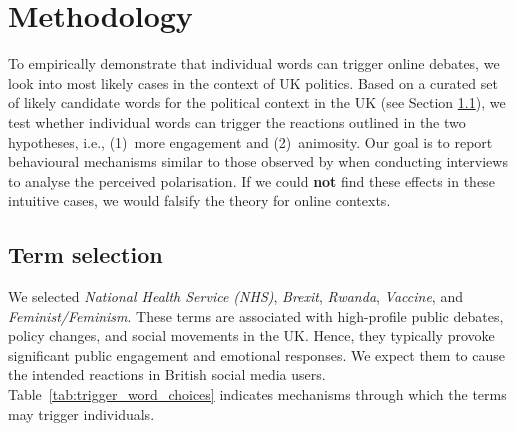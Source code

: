 \section{Methodology}
To empirically demonstrate that individual words can trigger online debates, we look into most likely cases in the context of UK politics. Based on a curated set of likely candidate words for the political context in the UK (see Section \ref{subsec:term_selection}), we test whether individual words can trigger the reactions outlined in the two hypotheses, i.e., (1)\ more engagement and (2)\ animosity. Our goal is to report behavioural mechanisms similar to those observed by \citet{mau2023triggerpunkte} when conducting interviews to analyse the perceived polarisation. If we could \textbf{not} find these effects in these intuitive cases, we would falsify the theory for online contexts.


\subsection{Term selection}\label{subsec:term_selection}
We selected \textit{National Health Service (NHS)}, \textit{Brexit}, \textit{Rwanda}, \textit{Vaccine}, and \textit{Feminist/Feminism}. These terms are associated with high-profile public debates, policy changes, and social movements in the UK. Hence, they typically provoke significant public engagement and emotional responses. We expect them to cause the intended reactions in British social media users. Table~\ref{tab:trigger_word_choices} indicates mechanisms through which the terms may trigger individuals. 


\begin{table}[]
\centering
{}
\caption{Trigger words and their respective trigger mechanisms (described in the introduction).}
\label{tab:trigger_word_choices}
\end{table}

